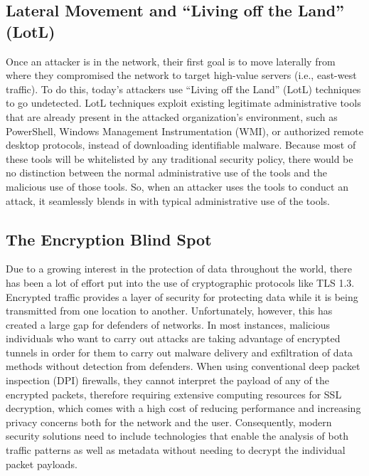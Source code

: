 \documentclass[12pt,a4paper]{report}
\begin{document}
\subsection{Lateral Movement and ``Living off the Land'' (LotL)}
Once an attacker is in the network, their first goal is to move laterally from where they compromised the network to target high-value servers (i.e., east-west traffic). To do this, today's attackers use ``Living off the Land'' (LotL) techniques to go undetected. LotL techniques exploit existing legitimate administrative tools that are already present in the attacked organization's environment, such as PowerShell, Windows Management Instrumentation (WMI), or authorized remote desktop protocols, instead of downloading identifiable malware. Because most of these tools will be whitelisted by any traditional security policy, there would be no distinction between the normal administrative use of the tools and the malicious use of those tools. So, when an attacker uses the tools to conduct an attack, it seamlessly blends in with typical administrative use of the tools.

\subsection{The Encryption Blind Spot}
Due to a growing interest in the protection of data throughout the world, there has been a lot of effort put into the use of cryptographic protocols like TLS 1.3. Encrypted traffic provides a layer of security for protecting data while it is being transmitted from one location to another. Unfortunately, however, this has created a large gap for defenders of networks. In most instances, malicious individuals who want to carry out attacks are taking advantage of encrypted tunnels in order for them to carry out malware delivery and exfiltration of data methods without detection from defenders. When using conventional deep packet inspection (DPI) firewalls, they cannot interpret the payload of any of the encrypted packets, therefore requiring extensive computing resources for SSL decryption, which comes with a high cost of reducing performance and increasing privacy concerns both for the network and the user. Consequently, modern security solutions need to include technologies that enable the analysis of both traffic patterns as well as metadata without needing to decrypt the individual packet payloads.

\end{document}
